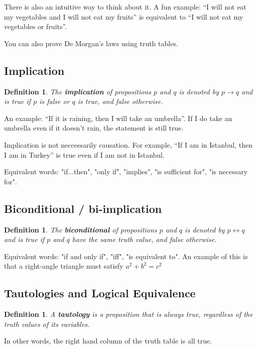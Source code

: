 \documentclass[12pt,a4paper]{article}
\newtheorem{definition}[theorem]{Definition}
\begin{document}
There is also an intuitive way to think about it. A fun example: ``I will not eat my vegetables and I will not eat my fruits'' is equivalent to ``I will not eat my vegetables or fruits''.

You can also prove De Morgan's laws using truth tables.

\subsection{Implication}
\begin{definition}
The \textbf{implication} of propositions $p$ and $q$ is denoted by $p \rightarrow q$ and is true if $p$ is false or $q$ is true, and false otherwise.
\end{definition}

An example: ``If it is raining, then I will take an umbrella''. If I do take an umbrella even if it doesn't rain, the statement is still true.

Implication is not neccessarily causation. For example, ``If I am in Istanbul, then I am in Turkey'' is true even if I am not in Istanbul.

Equivalent words: "if...then", "only if", "implies", "is sufficient for", "is necessary for".

\subsection{Biconditional / bi-implication}
\begin{definition}
The \textbf{biconditional} of propositions $p$ and $q$ is denoted by $p \leftrightarrow q$ and is true if $p$ and $q$ have the same truth value, and false otherwise.
\end{definition}

Equivalent words: "if and only if", "iff", "is equivalent to". An example of this is that a right-angle triangle must satisfy $a^2 + b^2 = c^2$

\subsection{Tautologies and Logical Equivalence}
\begin{definition}
A \textbf{tautology} is a proposition that is always true, regardless of the truth values of its variables.
\end{definition}

In other words, the right hand column of the truth table is all true.
\end{document}
